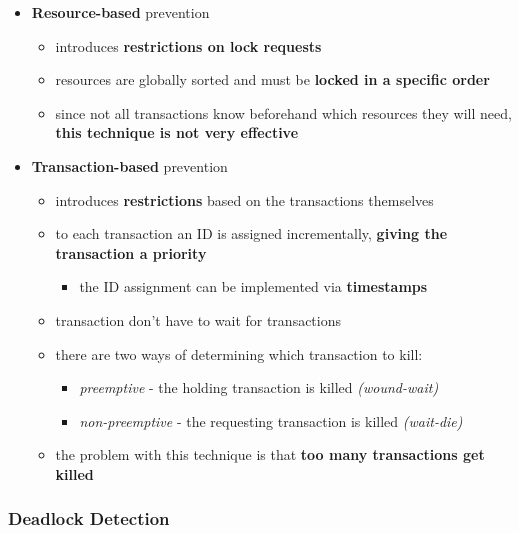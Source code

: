 \documentclass[english]{article}
\begin{document}
\begin{itemize}
  \item \textbf{Resource-based} prevention
        \begin{itemize}
          \item introduces \textbf{restrictions on lock requests}
          \item resources are globally sorted and must be \textbf{locked in a specific order}
          \item since not all transactions know beforehand which resources they will need, \textbf{this technique is not very effective}
        \end{itemize}
  \item \textbf{Transaction-based} prevention
        \begin{itemize}
          \item introduces \textbf{restrictions} based on the transactions themselves
          \item to each transaction an ID is assigned incrementally, \textbf{giving the transaction a priority}
                \begin{itemize}
                  \item the ID assignment can be implemented via \textbf{timestamps}
                \end{itemize}
          \item {} transaction don't have to wait for  transactions
          \item there are two ways of determining which transaction to kill:
                \begin{itemize}
                  \item \textit{preemptive} - the holding transaction is killed \textit{(wound-wait)}
                  \item \textit{non-preemptive} - the requesting transaction is killed \textit{(wait-die)}
                \end{itemize}
          \item the problem with this technique is that \textbf{too many transactions get killed}
        \end{itemize}
\end{itemize}

\subsubsection{Deadlock Detection}
\end{document}
